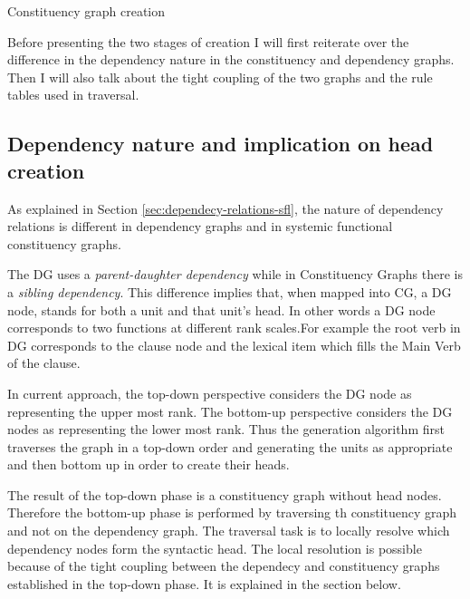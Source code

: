 \begin{algorithm}[H]
	\caption{Constituency graph creation}
	\label{alg:creation-of-cg}
\end{algorithm}

Before presenting the two stages of creation I will first reiterate over the difference in the dependency nature in the constituency and dependency graphs. Then I will also talk about the tight coupling of the two graphs and the rule tables used in traversal. 

\subsection{Dependency nature and implication on head creation}
\label{sec:dep-implications}
As explained in Section \ref{sec:dependecy-relations-sfl}, the nature of dependency relations is different in dependency graphs and in systemic functional constituency graphs. 

The DG uses a \textit{parent-daughter dependency} while in Constituency Graphs there is a \textit{sibling dependency}. This difference implies that, when mapped into CG, a DG node, stands for both a unit and that unit's head. In other words a DG node corresponds to two functions at different rank scales.For example the root verb in DG corresponds to the clause node and the lexical item which fills the Main Verb of the clause. 

In current approach, the top-down perspective considers the DG node as representing the upper most rank. The bottom-up perspective considers the DG nodes as representing the lower most rank. Thus the generation algorithm first traverses the graph in a top-down order and generating the units as appropriate and then bottom up in order to create their heads.

The result of the top-down phase is a constituency graph without head nodes. Therefore the bottom-up phase is performed by traversing th constituency graph and not on the dependency graph. The traversal task is to locally resolve which dependency nodes form the syntactic head. The local resolution is possible because of the tight coupling between the dependecy and constituency graphs established in the top-down phase. It is explained in the section below.

